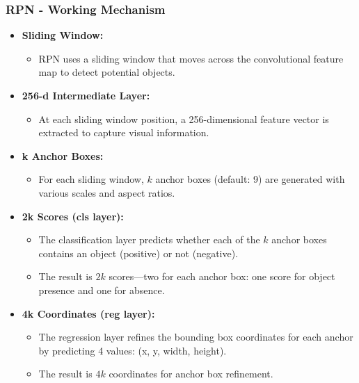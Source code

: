 \documentclass{beamer}
\begin{document}
\begin{frame}
    \frametitle{RPN - Working Mechanism}

    \begin{itemize}
        \item \textbf{Sliding Window:}
        \begin{itemize}
            \item RPN uses a sliding window that moves across the convolutional feature map to detect potential objects.
        \end{itemize}

        \item \textbf{256-d Intermediate Layer:}
        \begin{itemize}
            \item At each sliding window position, a 256-dimensional feature vector is extracted to capture visual information.
        \end{itemize}

        \item \textbf{k Anchor Boxes:}
        \begin{itemize}
            \item For each sliding window, \(k\) anchor boxes (default: 9) are generated with various scales and aspect ratios.
        \end{itemize}

        \item \textbf{2k Scores (cls layer):}
        \begin{itemize}
            \item The classification layer predicts whether each of the \(k\) anchor boxes contains an object (positive) or not (negative).
            \item The result is \(2k\) scores—two for each anchor box: one score for object presence and one for absence.
        \end{itemize}

        \item \textbf{4k Coordinates (reg layer):}
        \begin{itemize}
            \item The regression layer refines the bounding box coordinates for each anchor by predicting 4 values: (x, y, width, height).
            \item The result is \(4k\) coordinates for anchor box refinement.
        \end{itemize}
    \end{itemize}
\end{frame}
\end{document}
